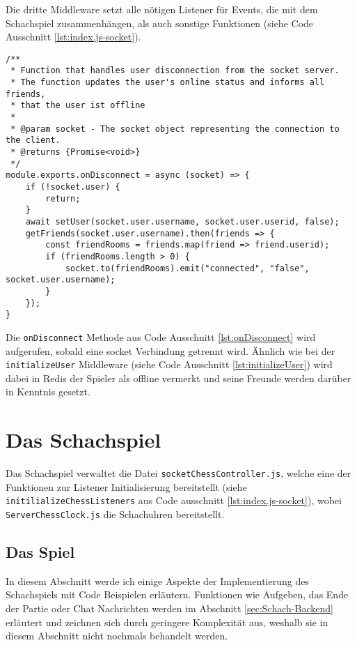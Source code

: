 Die dritte Middleware setzt alle nötigen Listener für Events, die mit dem Schachspiel zusammenhängen, als auch sonstige Funktionen (siehe Code Ausschnitt \ref{lst:index.js-socket}).

\begin{lstlisting}[style=codeStyle, caption={Die onDisconnect Methode für Sockets}, label={lst:onDisconnect}]
/**
 * Function that handles user disconnection from the socket server.
 * The function updates the user's online status and informs all friends,
 * that the user ist offline
 *
 * @param socket - The socket object representing the connection to the client.
 * @returns {Promise<void>}
 */
module.exports.onDisconnect = async (socket) => {
    if (!socket.user) {
        return;
    }
    await setUser(socket.user.username, socket.user.userid, false);
    getFriends(socket.user.username).then(friends => {
        const friendRooms = friends.map(friend => friend.userid);
        if (friendRooms.length > 0) {
            socket.to(friendRooms).emit("connected", "false", socket.user.username);
        }
    });
}
\end{lstlisting}

Die \verb|onDisconnect| Methode aus Code Ausschnitt \ref{lst:onDisconnect} wird aufgerufen, sobald eine socket Verbindung getrennt wird. Ähnlich wie bei der \verb|initializeUser| Middleware (siehe Code Ausschnitt \ref{lst:initializeUser}) wird dabei in Redis der Spieler als offline vermerkt und seine Freunde werden darüber in Kenntnis gesetzt.


\section{Das Schachspiel}
Das Schachspiel verwaltet die Datei \verb|socketChessController.js|, welche eine der Funktionen zur Listener Initialisierung bereitstellt (siehe \verb|initilializeChessListeners| aus Code ausschnitt \ref{lst:index.js-socket}), wobei \verb|ServerChessClock.js| die Schachuhren bereitstellt.

\subsection{Das Spiel}
In diesem Abschnitt werde ich einige Aspekte der Implementierung des Schachspiels mit Code Beispielen erläutern. Funktionen wie Aufgeben, das Ende der Partie oder Chat Nachrichten werden im Abschnitt \ref{sec:Schach-Backend} erläutert und zeichnen sich durch geringere Komplexität aus, weshalb sie in diesem Abschnitt nicht nochmals behandelt werden.
